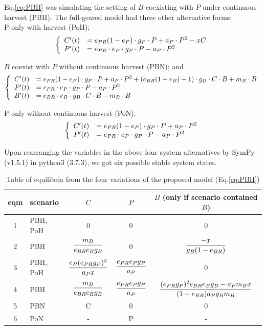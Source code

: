 \documentclass[../thesis.tex]{subfiles} %
\begin{document}
Eq.\ref{eq:PBH} was simulating the setting of $B$ coexisting with $P$ under continuous harvest (PBH).  The full-geared model had three other alternative forms:\\
P-only with harvest (PoH);
\begin{equation}\left\{\begin{array}{rl}
    C'(t) &= e_{PR}(1-e_P)\cdot g_P\cdot P +a_P\cdot P^2 -xC\\
    P'(t) &= e_{PR}\cdot e_P\cdot g_P\cdot P -a_P\cdot P^2
\end{array}\right.\label{eq:PoH}\end{equation}

$B$ coexist with $P$ without continuous harvest (PBN); and
\begin{equation}\left\{\begin{array}{rl}
    C'(t) &= e_{PR}(1-e_P)\cdot g_P\cdot P +a_P\cdot P^2 +(e_{BR}(1-e_B)-1)\cdot g_B\cdot C\cdot B +m_B\cdot B\\
    P'(t) &= e_{PR}\cdot e_P\cdot g_P\cdot P -a_P\cdot P^2\\
    B'(t) &= e_{BR}\cdot e_B\cdot g_B\cdot C\cdot B -m_B\cdot B
\end{array}\right.\label{eq:PBN}\end{equation}

P-only without continuous harvest (PoN).
\begin{equation}\left\{\begin{array}{rl}
    C'(t) &= e_{PR}(1-e_P)\cdot g_P\cdot P +a_P\cdot P^2\\
    P'(t) &= e_{PR}\cdot e_P\cdot g_P\cdot P -a_P\cdot P^2
\end{array}\right.\label{eq:PoN}\end{equation}

Upon rearranging the variables in the above four system alternatives by SymPy (v1.5.1) in python3 (3.7.3), we got six possible stable system states.

\begin{table}[H]
    \centering
    \caption{Table of equilibria from the four variations of the proposed model (Eq.\ref{eq:PBH})}
    \begin{tabular}{cl|ccc}\hline
        eqm & scenario & $C$ & $P$ & $B$ (only if scenario contained $B$) \\\hline
        1 & PBH, PoH & 0 & 0 & 0 \\
        2 & PBH & $\dfrac{m_B}{e_{BR}e_Bg_B}$ & 0 & $\dfrac{-x}{g_B(1-e_{BR})}$ \\
        3 & PBH, PoH & $\dfrac{e_P(e_{PR}g_P)^2}{a_P x}$ & $\dfrac{e_{PR}e_Pg_P}{a_P}$ & 0 \\
        4 & PBH & $\dfrac{m_B}{e_{BR}e_Bg_B}$ & $\dfrac{e_{PR}e_Pg_P}{a_P}$ & $\dfrac{(e_{PR}g_P)^2e_{BR}e_Bg_B-a_Pm_B x}{(1-e_{BR})a_Pg_Bm_B}$ \\
        5 & PBN & C & 0 & 0 \\
        6 & PoN & - & P & - \\\hline
    \end{tabular}
    \label{t:eqm}
\end{table}
\end{document}
